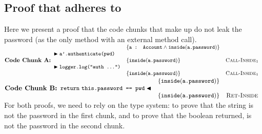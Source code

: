 \documentclass[11pt]{article} %
\theoremstyle{definition}
\newcommand{\onCall}[1]{\blacktriangleright #1}
\newcommand{\onReturn}[1]{#1 \blacktriangleleft}
\begin{document}
\subsection{Proof that  adheres to }
Here we present a proof that the code chunks that make up 
do not leak the password (as the only method with an external method call).\\
\begin{math}
	\textbf{Code Chunk A:}\\
\small
  \begin{array}{llr}
  & \{\prg{a : Account} \wedge \wrapped{\prg{a.password}}\}\\
  \onCall{\prg{a'.authenticate(pwd)}} &   \\
  & \{\wrapped{\prg{a.password}}\} & \textsc{Call-Inside$_1$}\\
  \onCall{\prg{logger.log(``auth ...'')}} &   \\
  & \{\wrapped{\prg{a.password}}\} & \textsc{Call-Inside$_1$}\\
  \end{array}
\end{math}\\
\begin{math}
	\textbf{Code Chunk B:}\\
\small
  \begin{array}{llr}
  & \{\wrapped{\prg{a.password}}\}\\
  \onReturn{\return \prg{this.password == pwd}} &   \\
  & \{\wrapped{\prg{a.password}}\} & \textsc{Ret-Inside}\\
  \end{array}
\end{math}\\
For both proofs, we need to rely on the type system: to prove that the string  
is not the password in the first chunk, and to prove that the boolean returned, is not the password 
in the second chunk.
\end{document}

